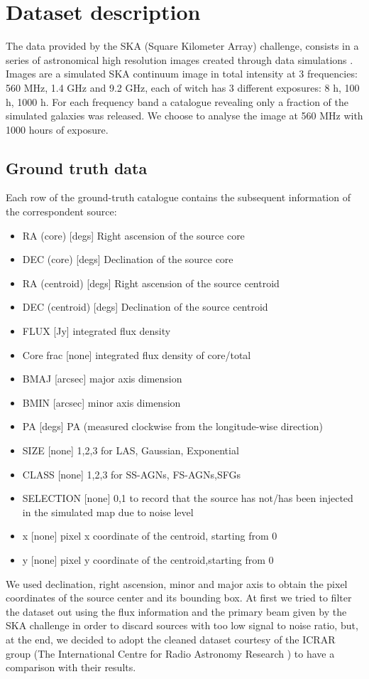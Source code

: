 \documentclass[a4paper,10pt]{report}
\begin{document}
\chapter{Dataset description}\label{chap:dataset-description}

The data provided by the SKA (Square Kilometer Array) challenge, consists in a series of astronomical high resolution images created through data simulations \cite{bonaldi2021square}.  Images are a simulated SKA continuum image in total intensity at 3 frequencies: 560 MHz, 1.4 GHz and  9.2 GHz, each of witch has 3 different exposures: 8 h, 100 h, 1000 h. For each frequency band a catalogue revealing only a fraction of the simulated galaxies was released. We choose to analyse the image at 560 MHz with 1000 hours of exposure. 

\section{Ground truth data} \label{sec:ground_truth_data}
Each row of the ground-truth catalogue contains the subsequent information of the correspondent source: 
\begin{itemize}
    \item RA (core)  [degs]    Right ascension of the source core
    \item DEC (core)    [degs]    Declination of the source core
    \item RA (centroid)    [degs]    Right ascension of the source centroid
    \item DEC (centroid)    [degs]    Declination of the source centroid
    \item FLUX    [Jy]    integrated flux density
    \item Core frac    [none]    integrated flux density of core/total
    \item  BMAJ    [arcsec]    major axis dimension
    \item  BMIN    [arcsec]    minor axis dimension
    \item  PA    [degs] PA (measured clockwise from the longitude-wise direction)
    \item    SIZE    [none]    1,2,3 for LAS, Gaussian, Exponential
    \item    CLASS    [none]    1,2,3 for SS-AGNs, FS-AGNs,SFGs
    \item  SELECTION    [none]  0,1 to record that the source has not/has been injected in the simulated map due to noise level
    \item    x    [none]    pixel x coordinate of the centroid, starting from 0
    \item   y    [none]    pixel y coordinate of the centroid,starting from 0
\end{itemize}
We used declination, right ascension, minor and major axis to obtain the pixel coordinates of the source center and its bounding box.
 At first we tried to filter the dataset out using the flux information and the primary beam given by the SKA challenge in order
  to discard sources with too low signal to noise ratio, but, at the end, we decided to adopt the cleaned dataset courtesy of the ICRAR group (The International Centre for Radio Astronomy Research ) to have a comparison with their results.
\end{document}
